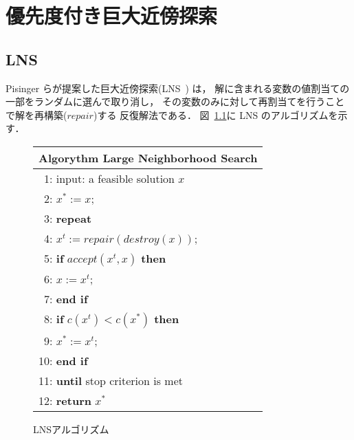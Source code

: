 \chapter{優先度付き巨大近傍探索}

\section{LNS}

Pisinger らが提案した巨大近傍探索(LNS~\cite{Pisinger10}) は，
解に含まれる変数の値割当ての一部をランダムに選んで取り消し，
その変数のみに対して再割当てを行うことで解を再構築($repair$)する
反復解法である．
図~\ref{algo:lns}に LNS のアルゴリズムを示す．

\begin{figure}[htb]\centering
\begin{tabular}{l}\hline
\textbf{Algorythm} Large Neighborhood Search\\\hline
 ~1: input: a feasible solution $x$ \\
 ~2: $x^{*} :=  x$; \\
 ~3: \bf{repeat} \\
 ~4: \quad \quad $x^{t} := repair(destroy(x))$; \\
 ~5: \quad \quad \textbf{if} $accept(x^{t}, x)$ \textbf{then} \\
 ~6: \quad \quad \quad \quad $x := x^{t}$; \\
 ~7: \quad \quad \textbf{end if} \\
 ~8: \quad \quad \textbf{if} $c(x^{t}) < c(x^{*})$ \textbf{then} \\
 ~9: \quad \quad \quad \quad $x^{*} := x^{t}$; \\
10: \quad \quad \textbf{end if} \\
11: \textbf{until} stop criterion is met \\
12: \textbf{return} $x^{*}$ \\ \hline
\end{tabular}
\caption{LNSアルゴリズム}
\label{algo:lns}
\end{figure}

